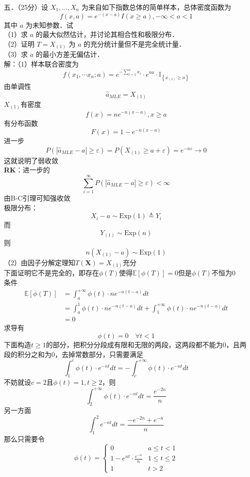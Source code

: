 \documentclass[UTF8,openany]{book}
\begin{document}
	\noindent 五．（25分）设 $X_1, \ldots, X_n$ 为来自如下指数总体的简单样本，总体密度函数为
	$$
	f(x , a)=e^{-(x-a)} I(x \geq a),-\infty<a<1
	$$
	其中 $a$ 为未知参数．试\\
	（1）求 $a$ 的最大似然估计，并讨论其相合性和极限分布．\\
	（2）证明 $T=X_{(1)}$ 为 $a$ 的充分统计量但不是完全统计量．\\
	（3）求 $a$ 的最小方差无偏估计．\\
	解：（1）样本联合密度为
	\[
	f\left(x_1, \cdots x_n ; a\right)=e^{-\sum_{i=1}^n x_i} \cdot e^{n a} \cdot \mathbb{I}_{\left\{x_{(1)} \geq a\right\}}
	\]
	由单调性
	\[
	\hat{a}_{MLE}=X_{(1)}
	\]
	$X_{(1)}$有密度
	\[
	f(x)=ne^{-n(x-a)},x\ge a
	\]
	有分布函数
	\[
	F(x)=1-e^{-n(x-a)}
	\]
	进一步
	\[
	P\left(\left|\hat{a}_{M L E}-a\right| \geqslant \varepsilon\right)=P(X_{(1)} \geqslant a+\varepsilon)=e^{-n \varepsilon} \rightarrow 0
	\]
	这就说明了弱收敛\\
	\textbf{RK}：进一步的
	\[
	\sum\limits_{i=1}^{\infty} P\left(\left|\hat{a}_{M L E}-a\right| \geqslant \varepsilon\right)<\infty
	\]
	由B-C引理可知强收敛\\
	极限分布：
	\[
	X_i-a\sim \mathrm{Exp}(1)\triangleq Y_i
	\]
	而
	\[
	Y_{(1)}\sim \mathrm{Exp}(n)
	\]
	则
	\[
	n(X_{(1)}-a)\sim \mathrm{Exp}(1)
	\]
	（2）由因子分解定理知$T(\boldsymbol{X})=X_{(1)}$充分\\
	下面证明它不是完全的，即存在$\phi(T)$使得$\mathbb{E}[\phi(T)]=0$但是$\phi(T)$不恒为0\\
	条件
	\[
	\begin{aligned}
		\mathbb{E}[\phi(T)]&=\int_a^{+\infty} \phi(t) \cdot n e^{-n(t-a)} d t\\
		&=\int_a^{1} \phi(t) \cdot n e^{-n(t-a)} d t+\int_1^{+\infty} \phi(t) \cdot n e^{-n(t-a)} d t\\
		&=0
	\end{aligned}
	\]
	求导有
	\[
	\phi(t)=0\quad \forall t<1
	\]
	下面构造$t\ge 1$的部分，把积分分段成有限和无限的两段，这两段都不能为0，且两段的积分之和为0，去掉常数部分，只需要满足
	\[
	\int_1^{c} \phi(t) \cdot  e^{-nt} d t=-\int_c^{+\infty} \phi(t) \cdot  e^{-nt} d t
	\]
	不妨就设$c=2$且$\phi(t)=1,t\ge 2$，则
	\[
	\int_2^{+\infty} \phi(t) \cdot  e^{-nt} d t=\frac{e^{-2n}}{n}
	\]
	另一方面
	\[
	\int_1^{2}    e^{-nt} d t=\frac{-e^{-2n}+e^{-n}}{n}
	\]
	那么只需要令
	\[
	\phi(t)=
	\begin{cases}
		0 & a\le t<1\\
		1-e^{nt}\cdot \frac{e^{-n}}{n}   &  1\le t\le 2\\
		1  &  t>2
	\end{cases}
	\]
\end{document}
